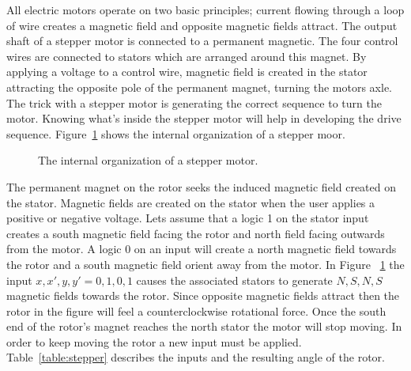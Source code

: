 All electric motors operate on two basic principles; 
current flowing through a loop of wire creates a magnetic
field and opposite magnetic fields attract.  
The output shaft of a stepper motor is connected to a permanent
magnetic.  The four control wires are connected to stators which
are arranged around this magnet.  By applying a voltage to a 
control wire, magnetic field is created in the stator 
attracting the opposite pole of the permanent magnet, turning 
the motors axle.  The trick with a stepper motor is generating
the correct sequence to turn the motor.  Knowing what's inside
the stepper motor will help in developing the drive sequence.  
Figure~\ref{fig:stepper} shows the internal organization of a
stepper moor.

\begin{figure}[ht]
\caption{The internal organization of a stepper motor.}
\label{fig:stepper}
\end{figure}

The permanent magnet on the rotor seeks the induced magnetic field
created on the stator.  Magnetic fields are created on the stator
when the user applies a positive or negative voltage.  Lets assume
that a logic 1 on the stator input creates a south magnetic field facing the rotor
and north field facing outwards from the motor.  A logic 0 on an input
will create a north magnetic field towards the rotor and a south magnetic
field orient away from the motor.  In Figure ~\ref{fig:stepper} 
the input $x,x',y,y' = 0,1,0,1$ causes the associated stators to generate
$N,S,N,S$ magnetic fields towards the rotor.  Since opposite magnetic
fields attract then the rotor in the figure will feel a counterclockwise 
rotational force.  Once the south end of the rotor's magnet reaches the
north stator the motor will stop moving.  In order to keep moving
the rotor a new input must be applied.  Table~\ref{table:stepper}
describes the inputs and the resulting angle of the rotor.

